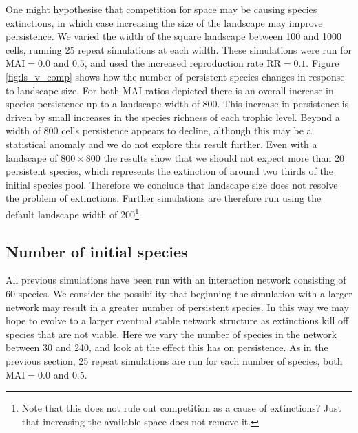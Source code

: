 One might hypothesise that competition for space may be causing species extinctions, in which case increasing the size of the landscape may improve persistence. We varied the width of the square landscape between 100 and 1000 cells, running 25 repeat simulations at each width. These simulations were run for MAI$=0.0$ and $0.5$, and used the increased reproduction rate RR$=0.1$. Figure \ref{fig:ls_v_comp} shows how the number of persistent species changes in response to landscape size. For both MAI ratios depicted there is an overall increase in species persistence up to a landscape width of 800. This increase in persistence is driven by small increases in the species richness of each trophic level. Beyond a width of 800 cells persistence appears to decline, although this may be a statistical anomaly and we do not explore this result further. Even with a landscape of $800 \times 800$ the results show that we should not expect more than 20 persistent species, which represents the extinction of around two thirds of the initial species pool. Therefore we conclude that landscape size does not resolve the problem of extinctions. Further simulations are therefore run using the default landscape width of 200\footnote{Note that this does not rule out competition as a cause of extinctions? Just that increasing the available space does not remove it.}. 

\newpage
\subsection{Number of initial species}
\label{sec:numsp_vp}

All previous simulations have been run with an interaction network consisting of 60 species. We consider the possibility that beginning the simulation with a larger network may result in a greater number of persistent species. In this way we may hope to evolve to a larger eventual stable network structure as extinctions kill off species that are not viable. Here we vary the number of species in the network between 30 and 240, and look at the effect this has on persistence. As in the previous section, 25 repeat simulations are run for each number of species, both MAI$=0.0$ and $0.5$.
 
